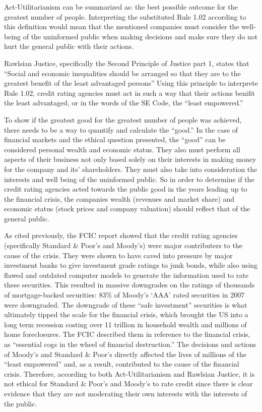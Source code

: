 \documentclass[11pt]{article}
\begin{document}
\begin{multicols}{2}
Act-Utilitarianism can be summarized as: the best possible outcome for the greatest number of people.\cite{utility}  Interpreting the substituted Rule 1.02 according to this definition would mean that the mentioned companies must consider the well-being of the uninformed public when making decisions and make sure they do not hurt the general public with their actions. 

Rawlsian Justice, specifically the Second Principle of Justice part 1, states that ``Social and economic inequalities should be arranged so that they are to the greatest benefit of the least advantaged persons'' \cite{rawlsian} Using this principle to interprete Rule 1.02, credit rating agencies must act in such a way that their actions benifit the least advantaged, or in the words of the SE Code, the ``least empowered.''  

To show if the greatest good for the greatest number of people was achieved, there needs to be a way to quantify and calculate the ``good.''  In the case of financial markets and the ethical question presented, the ``good'' can be considered personal wealth and economic status.  They also must perform all aspects of their business not only based solely on their interests in making money for the company and its' shareholders.  They must also take into consideration the interests and well being of the uninformed public.  So in order to determine if the credit rating agencies acted towards the public good in the years leading up to the financial crisis, the companies wealth (revenues and market share) and economic status (stock prices and company valuation) should reflect that of the general public.

As cited previously, the FCIC report showed that the credit rating agencies (specifically Standard \& Poor's and Moody's) were major contributers to the cause of the crisis. \cite{govtReport, huffCreditCause}  They were shown to have caved into pressure by major investment banks to give investment grade ratings to junk bonds, while also using flawed and outdated computer models to generate the information used to rate these securities. \cite[p.~xxv]{govtReport}  This resulted in massive downgrades on the ratings of thousands of mortgage-backed securities: 83\% of Moody's `AAA' rated securities in 2007 were downgraded. \cite[p.~xxv]{govtReport} The downgrade of these ``safe investment'' securities is what ultimately tipped the scale for the financial crisis, which brought the US into a long term recession costing over 11 trillion in household wealth and millions of home foreclosures. The FCIC described them in reference to the financial crisis, as ``essential cogs in the wheel of financial destruction.'' The decisions and actions of Moody's and Standard \& Poor's directly affected the lives of millions of the ``least empowered'' and, as a result, contributed to the cause of the financial crisis. Therefore, according to both Act-Utilitarianism and Rawlsian Justice, it is not ethical for Standard \& Poor's and Moody's to rate credit since there is clear evidence that they are not moderating their own interests with the interests of the public.


\end{multicols}
\end{document}
